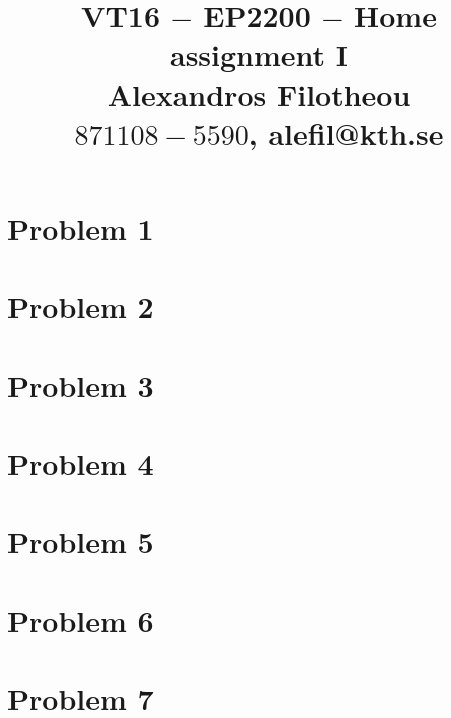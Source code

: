 \documentclass[oneside,12pt]{article}
\title{VT16 $-$ EP2200 $-$ Home assignment I \\ Alexandros Filotheou \\ $871108-5590$, alefil@kth.se }
\date{}
\begin{document}
	\maketitle

  \section{Problem 1}
  
  \section{Problem 2}
  
  \section{Problem 3}
  
  \section{Problem 4}
  
  \section{Problem 5}
  
  \section{Problem 6}
  
  \section{Problem 7}
  
\end{document}
